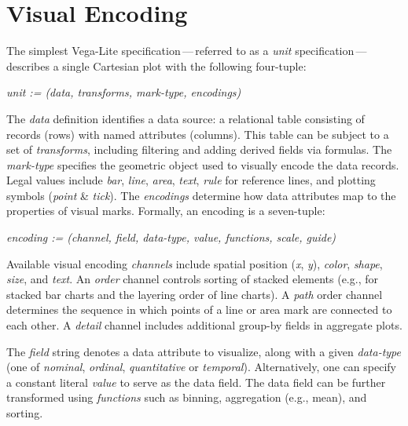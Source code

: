 
\vspace{-20pt}

\section{Visual Encoding}
\label{sec:vl:gog}

\vspace{-7pt}

The simplest Vega-Lite specification\,---\,referred to as a \emph{unit}
specification\,---\,describes a single Cartesian plot with the following
four-tuple:

\vspace{7pt}
\centerline{\emph{unit := (data, transforms, mark-type, encodings)}}

The \emph{data} definition identifies a data source: a relational table
consisting of records (rows) with named attributes (columns). This table can be
subject to a set of \emph{transforms}, including filtering and adding derived
fields via formulas. The \emph{mark-type} specifies the geometric object used to
visually encode the data records. Legal values include \emph{bar}, \emph{line},
\emph{area}, \emph{text}, \emph{rule} for reference lines, and plotting symbols
(\emph{point} \& \emph{tick}). The \emph{encodings} determine how data
attributes map to the properties of visual marks. Formally, an encoding is a
seven-tuple:

\vspace{7pt}
\centerline{\emph{encoding := (channel, field, data-type, value, functions, scale, guide)}}

Available visual encoding \emph{channels} include spatial position (\emph{x},
\emph{y}), \emph{color}, \emph{shape}, \emph{size}, and \emph{text}. An
\emph{order} channel controls sorting of stacked elements (e.g., for stacked bar
charts and the layering order of line charts). A \emph{path} order channel
determines the sequence in which points of a line or area mark are connected to
each other. A \emph{detail} channel includes additional group-by fields in
aggregate plots.

The \emph{field} string denotes a data attribute to visualize, along with a
given \emph{data-type} (one of \emph{nominal}, \emph{ordinal}, \emph{quantitative} or
\emph{temporal}). Alternatively, one can specify a constant literal \emph{value}
to serve as the data field. The data field can be further transformed using
\emph{functions} such as binning, aggregation (e.g., mean), and sorting.


